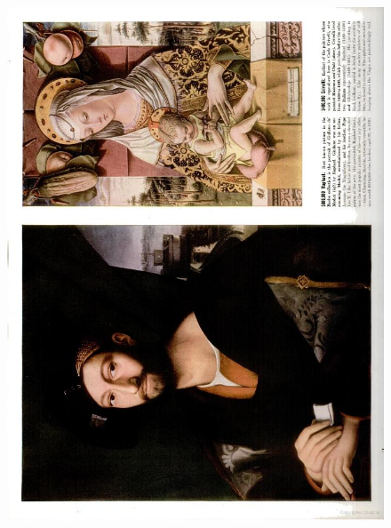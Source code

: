 \begin{figure}

\centering
\includegraphics[height=\textheight, width=\textwidth, keepaspectratio]{./images/goya-sideways01.jpg}
\end{figure}

\pagebreak






